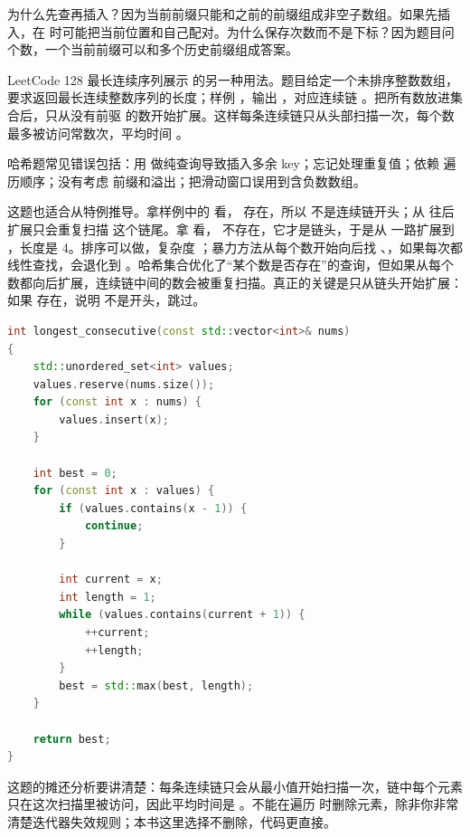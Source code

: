 为什么先查再插入？因为当前前缀只能和之前的前缀组成非空子数组。如果先插入，在  时可能把当前位置和自己配对。为什么保存次数而不是下标？因为题目问个数，一个当前前缀可以和多个历史前缀组成答案。

LeetCode 128 最长连续序列展示  的另一种用法。题目给定一个未排序整数数组，要求返回最长连续整数序列的长度；样例 ，输出 ，对应连续链 。把所有数放进集合后，只从没有前驱  的数开始扩展。这样每条连续链只从头部扫描一次，每个数最多被访问常数次，平均时间 。

哈希题常见错误包括：用  做纯查询导致插入多余 key；忘记处理重复值；依赖  遍历顺序；没有考虑  前缀和溢出；把滑动窗口误用到含负数数组。

这题也适合从特例推导。拿样例中的  看， 存在，所以  不是连续链开头；从  往后扩展只会重复扫描  这个链尾。拿  看， 不存在，它才是链头，于是从  一路扩展到 ，长度是 4。排序可以做，复杂度 ；暴力方法从每个数开始向后找 、，如果每次都线性查找，会退化到 。哈希集合优化了“某个数是否存在”的查询，但如果从每个数都向后扩展，连续链中间的数会被重复扫描。真正的关键是只从链头开始扩展：如果  存在，说明  不是开头，跳过。

\begin{lstlisting}[language=C++,caption={LeetCode 128 最长连续序列：只从链头扩展}]
int longest_consecutive(const std::vector<int>& nums)
{
    std::unordered_set<int> values;
    values.reserve(nums.size());
    for (const int x : nums) {
        values.insert(x);
    }

    int best = 0;
    for (const int x : values) {
        if (values.contains(x - 1)) {
            continue;
        }

        int current = x;
        int length = 1;
        while (values.contains(current + 1)) {
            ++current;
            ++length;
        }
        best = std::max(best, length);
    }

    return best;
}
\end{lstlisting}

这题的摊还分析要讲清楚：每条连续链只会从最小值开始扫描一次，链中每个元素只在这次扫描里被访问，因此平均时间是 。不能在遍历  时删除元素，除非你非常清楚迭代器失效规则；本书这里选择不删除，代码更直接。

